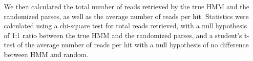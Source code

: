 We then calculated the total number of reads retrieved by the true HMM and the randomized parses, as well as the average number of reads per hit. Statistics were calculated using a chi-square test for total reads retrieved, with a null hypothesis of 1:1 ratio between the true HMM and the randomized parses, and a student's t-test of the average number of reads per hit with a null hypothesis of no difference between HMM and random. 
\begin{singlespace}
\printbibliography[heading=bibintoc,title={References}]
\end{singlespace}